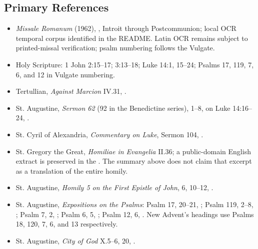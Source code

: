 \begin{deepstudy}
\section*{Primary References}
{\small
\begin{itemize}
\item \emph{Missale Romanum} (1962), , Introit through Postcommunion; local OCR temporal corpus identified in the README. Latin OCR remains subject to printed-missal verification; psalm numbering follows the Vulgate.
\item Holy Scripture: 1 John 2:15--17; 3:13--18; Luke 14:1, 15--24; Psalms 17, 119, 7, 6, and 12 in Vulgate numbering.
\item Tertullian, \emph{Against Marcion} IV.31, .
\item St. Augustine, \emph{Sermon 62} (92 in the Benedictine series), 1--8, on Luke 14:16--24, .
\item St. Cyril of Alexandria, \emph{Commentary on Luke}, Sermon 104, .
\item St. Gregory the Great, \emph{Homiliae in Evangelia} II.36; a public-domain English extract is preserved in the . The summary above does not claim that excerpt as a translation of the entire homily.
\item St. Augustine, \emph{Homily 5 on the First Epistle of John}, 6, 10--12, .
\item St. Augustine, \emph{Expositions on the Psalms}: Psalm 17, 20--21, ; Psalm 119, 2--8, ; Psalm 7, 2, ; Psalm 6, 5, ; Psalm 12, 6, . New Advent's headings use Psalms 18, 120, 7, 6, and 13 respectively.
\item St. Augustine, \emph{City of God} X.5--6, 20, .
\end{itemize}
}

\end{deepstudy}


